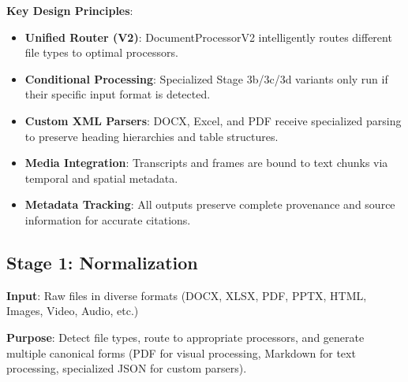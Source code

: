 \textbf{Key Design Principles}:
\begin{itemize}
    \item \textbf{Unified Router (V2)}: DocumentProcessorV2 intelligently routes different file types to optimal processors.
    \item \textbf{Conditional Processing}: Specialized Stage 3b/3c/3d variants only run if their specific input format is detected.
    \item \textbf{Custom XML Parsers}: DOCX, Excel, and PDF receive specialized parsing to preserve heading hierarchies and table structures.
    \item \textbf{Media Integration}: Transcripts and frames are bound to text chunks via temporal and spatial metadata.
    \item \textbf{Metadata Tracking}: All outputs preserve complete provenance and source information for accurate citations.
\end{itemize}


\subsection{Stage 1: Normalization}

\textbf{Input}: Raw files in diverse formats (DOCX, XLSX, PDF, PPTX, HTML, Images, Video, Audio, etc.)

\textbf{Purpose}: Detect file types, route to appropriate processors, and generate multiple canonical forms (PDF for visual processing, Markdown for text processing, specialized JSON for custom parsers).

